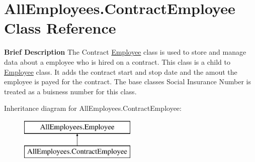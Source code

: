 \hypertarget{class_all_employees_1_1_contract_employee}{}\section{All\+Employees.\+Contract\+Employee Class Reference}
\label{class_all_employees_1_1_contract_employee}


{\bfseries Brief Description} The Contract \hyperlink{class_all_employees_1_1_employee}{Employee} class is used to store and manage data about a employee who is hired on a contract. This class is a child to \hyperlink{class_all_employees_1_1_employee}{Employee} class. It adds the contract start and stop date and the amout the employee is payed for the contract. The base classes Social Insurance Number is treated as a buisness number for this class.  


Inheritance diagram for All\+Employees.\+Contract\+Employee\+:\begin{figure}[H]
\begin{center}
\leavevmode
\includegraphics[height=2.000000cm]{class_all_employees_1_1_contract_employee}
\end{center}
\end{figure}
